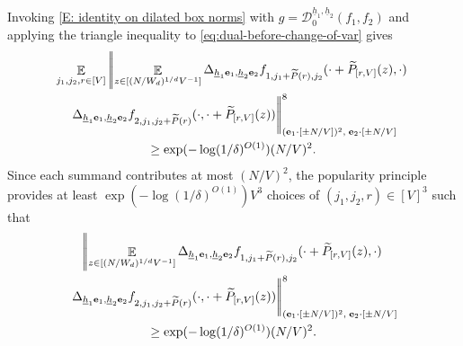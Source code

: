 \documentclass[11pt]{amsart}
\theoremstyle{definition}
\DeclareMathOperator*{\E}{\mathbb{E}}
\newcommand{\be}{{\mathbf{e}}}
\newcommand{\uh}{{\underline{h}}}
\begin{document}
Invoking \eqref{E: identity on dilated box norms} with $g = \mathcal{D}_0^{\uh_1,\uh_2}(f_1,f_2)$ and applying the triangle inequality to \eqref{eq:dual-before-change-of-var} gives
\begin{multline*}
\E_{j_1,j_2,r \in [V]}\left|\!\left|\E_{z \in [(N/W_d)^{1/d}V^{-1}]} \Delta_{\uh_1 \be_1,\uh_2 \be_2} f_{1,j_1+\widetilde P(r),j_2}(\cdot+\widetilde P_{[r, V]}(z),\cdot)\right.\right.\\
\left.\left. \Delta_{\uh_1 \be_1,\uh_2 \be_2} f_{2,j_1, j_2+\widetilde P(r)}(\cdot, \cdot+\widetilde P_{[r, V]}(z))\vphantom{\E_{z \in [(N/W_d)^{1/d}V^{-1}]}}\right|\!\right|_{(\be_1\cdot[\pm N/V])^2,\; \be_2\cdot[\pm N/V]}^8\\
\geq \exp(-\log(1/\delta)^{O(1)}) (N/V)^2.
\end{multline*}
  Since each summand contributes at most $(N/V)^2$, the popularity principle provides at least $\exp(-\log(1/\delta)^{O(1)}) V^3$ choices of $(j_1,j_2,r)\in[V]^3$ such that
  \begin{multline*}
      \left|\!\left|\E_{z \in [(N/W_d)^{1/d}V^{-1}]} \Delta_{\uh_1 \be_1,\uh_2 \be_2} f_{1,j_1+\widetilde P(r),j_2}(\cdot+\widetilde P_{[r, V]}(z),\cdot)\right.\right.\\
      \left.\left. \Delta_{\uh_1 \be_1,\uh_2 \be_2} f_{2,j_1, j_2+\widetilde P(r)}(\cdot, \cdot+\widetilde P_{[r, V]}(z))\vphantom{\E_{z \in [(N/W_d)^{1/d}V^{-1}]}}\right|\!\right|_{(\be_1\cdot[\pm N/V])^2,\; \be_2\cdot[\pm N/V]}^8\\
      \geq \exp(-\log(1/\delta)^{O(1)})(N/V)^2.
  \end{multline*}
\end{document}
